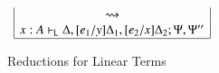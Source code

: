 \documentclass{lmcs}
\newcommand{\DualLNLLogicnt}[1]{\mathit{#1}}
\newcommand{\DualLNLLogicmv}[1]{\mathit{#1}}
\newcommand{\DualLNLLogicsym}[1]{#1}
\begin{document}
\begin{figure}
\begin{mdframed}
\begin{center}
\begin{math}
\begin{array}{c}
\begin{array}{|c|}
          \rightsquigarrow\\
           \DualLNLLogicmv{x}  :  \DualLNLLogicnt{A}  \vdash_{\mathsf{L} }  \Delta  \DualLNLLogicsym{,}  \DualLNLLogicsym{[}  \DualLNLLogicnt{e_{{\mathrm{1}}}}  \DualLNLLogicsym{/}  \DualLNLLogicmv{y}  \DualLNLLogicsym{]}  \Delta_{{\mathrm{1}}}  \DualLNLLogicsym{,}  \DualLNLLogicsym{[}  \DualLNLLogicnt{e_{{\mathrm{2}}}}  \DualLNLLogicsym{/}  \DualLNLLogicmv{x}  \DualLNLLogicsym{]}  \Delta_{{\mathrm{2}}} ; \Psi  \DualLNLLogicsym{,}  \Psi'' \\
          \hline
        \end{array}
      \end{array}
    \end{math}
  \end{center}
  \end{mdframed}
  \caption{Reductions for Linear Terms}
  \label{fig:red-linear-terms}
\end{figure}
\end{document}
